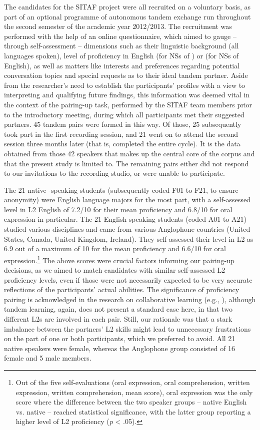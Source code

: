 \documentclass[output=paper,colorlinks,citecolor=brown,modfonts,nonflat]{../langscibook}
\begin{document}
The candidates for the SITAF project were all recruited on a voluntary basis, as part of an optional programme of autonomous tandem exchange run throughout the second semester of the academic year 2012/2013. The recruitment was performed with the help of an online questionnaire, which aimed to gauge – through self-assessment – dimensions such as their linguistic background (all languages spoken), level of proficiency in English (for NSs of ) or  (for NSs of English), as well as matters like interests and preferences regarding potential conversation topics and special requests as to their ideal tandem partner. Aside from the researcher’s need to establish the participants' profiles with a view to interpreting and qualifying future findings, this information was deemed vital in the context of the pairing-up task, performed by the SITAF team members prior to the introductory meeting, during which all participants met their suggested partners. 45 tandem pairs were formed in this way. Of those, 25 subsequently took part in the first recording session, and 21 went on to attend the second session three months later (that is, completed the entire cycle). It is the data obtained from those 42 speakers that makes up the central core of the corpus and that the present study is limited to. The remaining pairs either did not respond to our invitations to the recording studio, or were unable to participate.

The 21 native -speaking students (subsequently coded F01 to F21, to ensure anonymity) were English language majors for the most part, with a self-assessed level in L2 English of 7.2/10 for their mean proficiency and 6.8/10 for oral expression in particular. The 21 English-speaking students (coded A01 to A21) studied various disciplines and came from various Anglophone countries (United States, Canada, United Kingdom, Ireland). They self-assessed their level in L2  as 6.9 out of a maximum of 10 for the mean proficiency and 6.6/10 for oral expression.\footnote{Out of the five self-evaluations (oral expression, oral comprehension, written expression, written comprehension, mean score), oral expression was the only score where the difference between the two speaker groups – native English vs. native  – reached statistical significance, with the latter group reporting a higher level of L2 proficiency (\textit{p} < .05).} The above scores were crucial factors informing our pairing-up decisions, as we aimed to match candidates with similar self-assessed L2 proficiency levels, even if those were not necessarily expected to be very accurate reflections of the participants’ actual abilities. The significance of proficiency pairing is acknowledged in the research on collaborative learning (e.g., \citealt{StorchAldosari2012}), although tandem learning, again, does not present a standard case here, in that two different L2s are involved in each pair. Still, our rationale was that a stark imbalance between the partners’ L2 skills might lead to unnecessary frustrations on the part of one or both participants, which we preferred to avoid. All 21 native  speakers were female, whereas the Anglophone group consisted of 16 female and 5 male members.
\end{document}
